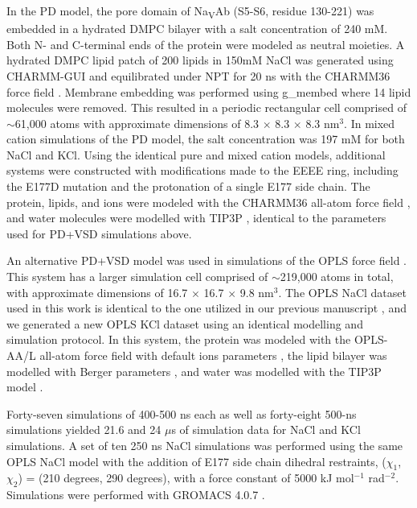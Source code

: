 \begin{refsection}
In the PD model, the pore domain of Na\textsubscript{V}Ab (S5-S6, residue 130-221) was embedded in a hydrated DMPC bilayer with a salt concentration of 240 mM. Both N- and C-terminal ends of the protein were modeled as neutral moieties. A hydrated DMPC lipid patch of 200 lipids in 150mM NaCl was generated using CHARMM-GUI \cite{Wu:2014uc} and equilibrated under NPT for 20 ns with the CHARMM36 force field \cite{Klauda:2010tn}. Membrane embedding was performed using g_membed \cite{Wolf:2010dr} where 14 lipid molecules were removed. This resulted in a periodic rectangular cell comprised of $\sim$61,000 atoms with approximate dimensions of 8.3 $\times$ 8.3 $\times$ 8.3 nm$^3$. In mixed cation simulations of the PD model, the salt concentration was 197 mM for both NaCl and KCl. Using the identical pure and mixed cation models, additional systems were constructed with modifications made to the EEEE ring, including the E177D mutation and the protonation of a single E177 side chain. The protein, lipids, and ions were modeled with the CHARMM36 all-atom force field \cite{Best:2012kb,Best:2012uu,MacKerell:1998tp,Klauda:2010tn}, and water molecules were modelled with TIP3P \cite{Jorgensen:1983ty}, identical to the parameters used for PD+VSD simulations above.

An alternative PD+VSD model was used in simulations of the OPLS force field \cite{Jorgensen:1996vx,Kaminski:2001eq}. This system has a larger simulation cell comprised of $\sim$219,000 atoms in total, with approximate dimensions of 16.7 $\times$ 16.7 $\times$ 9.8 nm$^3$. The OPLS NaCl dataset used in this work is identical to the one utilized in our previous manuscript \cite{Chakrabarti:2013kd}, and we generated a new OPLS KCl dataset using an identical modelling and simulation protocol. In this system, the protein was modeled with the OPLS-AA/L all-atom force field \cite{Jorgensen:1996vx,Kaminski:2001eq} with default ions parameters \cite{Aqvist:1990ud}, the lipid bilayer was modelled with Berger parameters \cite{Berger:1997bc}, and water was modelled with the TIP3P model \cite{Jorgensen:1983ty}. 

Forty-seven simulations of 400-500 ns each as well as forty-eight 500-ns simulations yielded 21.6 and 24 $\mu$s of simulation data for NaCl and KCl simulations. A set of ten 250 ns NaCl simulations was performed using the same OPLS NaCl model with the addition of E177 side chain dihedral restraints, ($\chi_1$,$\chi_2$) = (210 degrees, 290 degrees), with a force constant of 5000 kJ mol$^{-1}$ rad$^{-2}$. Simulations were performed with GROMACS 4.0.7 \cite{Hess:2008db}. 


\end{refsection}
